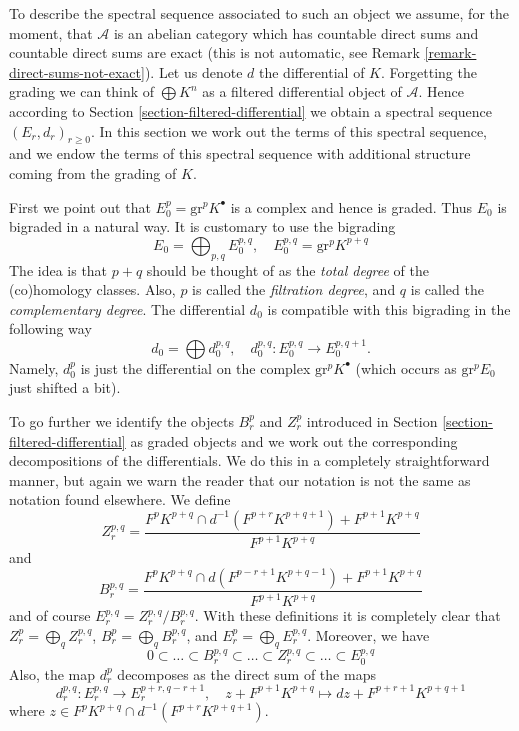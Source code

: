 \medskip\noindent
To describe the spectral sequence associated to such an object
we assume, for the moment, that $\mathcal{A}$ is an abelian category
which has countable direct sums and countable direct sums are exact
(this is not automatic, see Remark \ref{remark-direct-sums-not-exact}).
Let us denote $d$ the differential of $K$. Forgetting the grading
we can think of $\bigoplus K^n$ as a filtered differential object of
$\mathcal{A}$. Hence according to Section \ref{section-filtered-differential}
we obtain a spectral sequence $(E_r, d_r)_{r \geq 0}$. In this section
we work out the terms of this spectral sequence, and we endow the terms
of this spectral sequence with additional structure coming from the
grading of $K$.

\medskip\noindent
First we point out that $E_0^p = \text{gr}^p K^\bullet$ is a
complex and hence is graded. Thus $E_0$ is bigraded in a natural
way. It is customary to use the bigrading
$$
E_0 = \bigoplus\nolimits_{p, q} E_0^{p, q},
\quad
E_0^{p, q} = \text{gr}^p K^{p + q}
$$
The idea is that $p + q$ should be thought of as the {\it total degree} of
the (co)homology classes. Also, $p$ is called the {\it filtration degree},
and $q$ is called the {\it complementary degree}.
The differential $d_0$ is compatible with this
bigrading in the following way
$$
d_0  = \bigoplus d_0^{p, q},
\quad
d_0^{p, q} : E_0^{p, q} \to E_0^{p, q + 1}.
$$
Namely, $d_0^p$ is just the differential on the complex
$\text{gr}^p K^\bullet$ (which occurs as $\text{gr}^pE_0$ just shifted
a bit).

\medskip\noindent
To go further we identify the objects $B_r^p$ and $Z_r^p$ introduced
in Section \ref{section-filtered-differential} as graded objects and
we work out the corresponding decompositions of the differentials.
We do this in a completely straightforward manner, but again we warn
the reader that our notation is not the same as notation found
elsewhere. We define
$$
Z_r^{p, q} =
\frac{F^pK^{p + q} \cap d^{-1}(F^{p + r}K^{p + q + 1}) + F^{p + 1}K^{p + q}}
{F^{p + 1}K^{p + q}}
$$
and
$$
B_r^{p, q} =
\frac{F^pK^{p + q} \cap d(F^{p - r + 1}K^{p + q - 1}) + F^{p + 1}K^{p + q}}
{F^{p + 1}K^{p + q}}
$$
and of course $E_r^{p, q} = Z_r^{p, q}/B_r^{p, q}$.
With these definitions it is completely clear that
$Z_r^p = \bigoplus_q Z_r^{p, q}$,
$B_r^p = \bigoplus_q B_r^{p, q}$, and
$E_r^p = \bigoplus_q E_r^{p, q}$. Moreover, we have
$$
0 \subset \ldots \subset B_r^{p, q} \subset
\ldots
\subset Z_r^{p, q} \subset \ldots \subset E_0^{p, q}
$$
Also, the map $d_r^p$ decomposes as the direct sum of the maps
$$
d_r^{p, q} : E_r^{p, q} \longrightarrow E_r^{p + r, q - r + 1},
\quad
z + F^{p + 1}K^{p + q}
\mapsto
dz + F^{p + r + 1}K^{p + q + 1}
$$
where $z \in F^pK^{p + q} \cap d^{-1}(F^{p + r}K^{p + q + 1})$.

